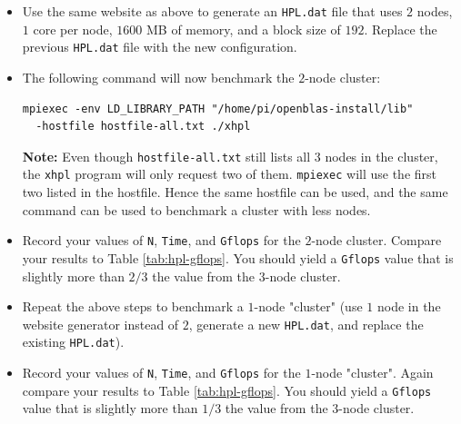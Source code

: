 \documentclass{article}
\begin{document}
\begin{itemize}
    \item Use the same website as above to generate an \texttt{HPL.dat} file that uses $2$ nodes, $1$ core per node, $1600$ MB of memory, and a block size of $192$. Replace the previous \texttt{HPL.dat} file with the new configuration.
    
    \item The following command will now benchmark the $2$-node cluster:
\begin{verbatim}
mpiexec -env LD_LIBRARY_PATH "/home/pi/openblas-install/lib"
  -hostfile hostfile-all.txt ./xhpl
\end{verbatim}

    \textbf{Note:} Even though \texttt{hostfile-all.txt} still lists all $3$ nodes in the cluster, the \texttt{xhpl} program will only request two of them.  \texttt{mpiexec} will use the first two listed in the hostfile. Hence the same hostfile can be used, and the same command can be used to benchmark a cluster with less nodes.
    
    \item Record your values of \texttt{N}, \texttt{Time}, and \texttt{Gflops} for the $2$-node cluster. Compare your results to Table \ref{tab:hpl-gflops}. You should yield a \texttt{Gflops} value that is slightly more than $2/3$ the value from the $3$-node cluster.
    
    \item Repeat the above steps to benchmark a $1$-node "cluster" (use $1$ node in the website generator instead of $2$, generate a new \texttt{HPL.dat}, and replace the existing \texttt{HPL.dat}).
    
    \item Record your values of \texttt{N}, \texttt{Time}, and \texttt{Gflops} for the $1$-node "cluster". Again compare your results to Table \ref{tab:hpl-gflops}. You should yield a \texttt{Gflops} value that is slightly more than $1/3$ the value from the $3$-node cluster.
\end{itemize}
\end{document}
